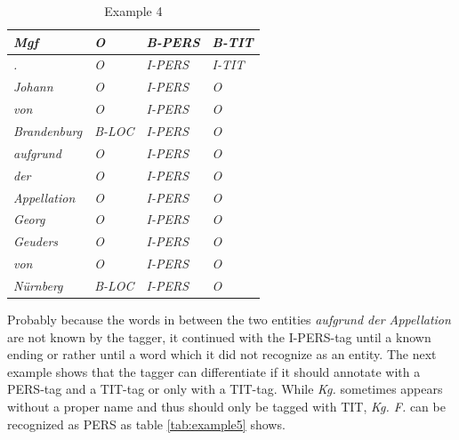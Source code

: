 \documentclass[11pt,a4paper]{article}
\begin{document}
\begin{table}
	\centering
	\begin{tabular}{l l l l}
		\textit{Mgf} & \textit{O} & \textit{B-PERS} & \textit{B-TIT}\\ \hline
		\textit{.} & \textit{O} & \textit{I-PERS} & \textit{I-TIT}\\ \hline
		\textit{Johann} & \textit{O} & \textit{I-PERS} & \textit{O}\\ \hline
		\textit{von} & \textit{O} & \textit{I-PERS} & \textit{O}\\ \hline
		\textit{Brandenburg} & \textit{B-LOC} & \textit{I-PERS} & \textit{O}\\ \hline
		\textit{aufgrund} & \textit{O} & \textit{\textcolor{customRed}{I-PERS}} & \textit{O}\\ \hline
		\textit{der} & \textit{O} & \textit{\textcolor{customRed}{I-PERS}} & \textit{O}\\ \hline
		\textit{Appellation} & \textit{O} & \textit{\textcolor{customRed}{I-PERS}} & \textit{O}\\ \hline
		\textit{Georg} & \textit{O} & \textit{\textcolor{customRed}{I}-PERS} & \textit{O}\\ \hline
		\textit{Geuders} & \textit{O} & \textit{I-PERS} & \textit{O}\\ \hline
		\textit{von} & \textit{O} & \textit{I-PERS} & \textit{O}\\ \hline
		\textit{N{\"u}rnberg} & \textit{B-LOC} & \textit{I-PERS} & \textit{O}\\ \hline
	\end{tabular}
	\caption{Example 4}
	\label{tab:example4}
\end{table}

Probably because the words in between the two entities \textit{aufgrund der Appellation} are not known by the tagger, it continued with the I-PERS-tag until a known ending or rather until a word which it did not recognize as an entity. The next example shows that the tagger can differentiate if it should annotate with a PERS-tag and a TIT-tag or only with a TIT-tag. While \textit{Kg.} sometimes appears without a proper name and thus should only be tagged with TIT, \textit{Kg. F.} can be recognized as PERS as table \ref{tab:example5} shows.
\end{document}
